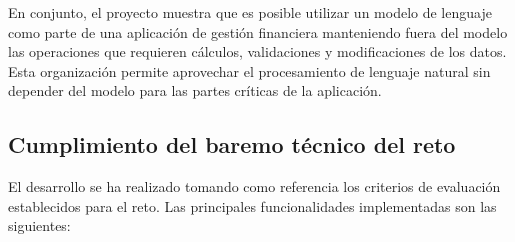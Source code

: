 En conjunto, el proyecto muestra que es posible utilizar un modelo de lenguaje
como parte de una aplicación de gestión financiera manteniendo fuera del modelo
las operaciones que requieren cálculos, validaciones y modificaciones de los
datos. Esta organización permite aprovechar el procesamiento de lenguaje
natural sin depender del modelo para las partes críticas de la aplicación.

\subsection{Cumplimiento del baremo técnico del reto}

El desarrollo se ha realizado tomando como referencia los criterios de
evaluación establecidos para el reto. Las principales funcionalidades
implementadas son las siguientes:

